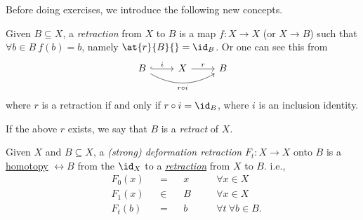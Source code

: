 \begin{definition*}
	Before doing exercises, we introduce the following new concepts.
	\begin{definition}[Retraction]\label{def:retraction}
		Given \(B\subseteq X\), a \emph{retraction} from \(X\) to \(B\) is a map \(f\colon X\to X\) (or \(X\to B\))
		such that \(\forall b\in B\ f(b) = b\), namely \(\at{r}{B}{} = \id_B\). Or one can see this from
		\[
			\begin{tikzcd}
				B \ar[rr, swap, bend right=30, "r \circ i"] \ar[r,hook,"i"] & X \ar[r, "r"] & B
			\end{tikzcd}
		\]
		where \(r\) is a retraction if and only if \(r\circ i = \id_B\), where \(i\) is an inclusion identity.
	\end{definition}

	\begin{definition}[Retract]\label{def:retract}
		If the above \(r\) exists, we say that \(B\) is a \emph{retract} of \(X\).
	\end{definition}

	\begin{definition}\label{def:deformation-retraction}
		Given \(X\) and \(B\subseteq X\), a \emph{(strong) deformation retraction} \(F_t\colon X\to X\) onto \(B\) is
		a \hyperref[def:homotopy]{homotopy} \(\rel B\) from the \(\id_X\) to a \hyperref[def:retraction]{\emph{retraction}}
		from \(X\) to \(B\). i.e.,
		\[
			\begin{alignedat}{4}
				 & F_0(x) &  & =   &  & x\quad &  & \forall x\in X             \\
				 & F_1(x) &  & \in &  & B\quad &  & \forall x\in X             \\
				 & F_t(b) &  & =   &  & b\quad &  & \forall t\ \forall b\in B.
			\end{alignedat}
		\]
	\end{definition}
\end{definition*}

